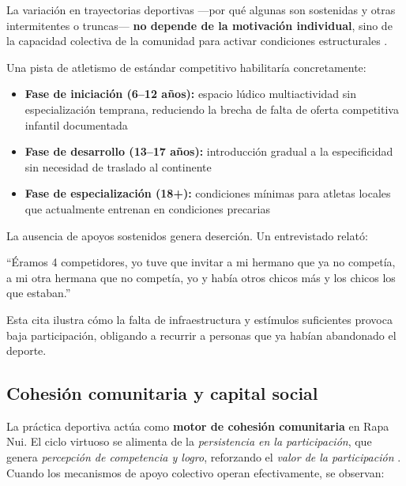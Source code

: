 \documentclass[12pt, a4paper]{article}
\begin{document}
La variación en trayectorias deportivas ---por qué algunas son sostenidas y otras
intermitentes o truncas--- \textbf{no depende de la motivación individual}, sino de
la capacidad colectiva de la comunidad para activar condiciones estructurales
\citep{ortega2026}.

Una pista de atletismo de estándar competitivo habilitaría concretamente:

\begin{itemize}[leftmargin=*, itemsep=4pt]
  \item \textbf{Fase de iniciación (6--12 años):} espacio lúdico multiactividad sin
        especialización temprana, reduciendo la brecha de falta de oferta competitiva
        infantil documentada
  \item \textbf{Fase de desarrollo (13--17 años):} introducción gradual a la
        especificidad sin necesidad de traslado al continente
  \item \textbf{Fase de especialización (18+):} condiciones mínimas para atletas
        locales que actualmente entrenan en condiciones precarias
\end{itemize}

La ausencia de apoyos sostenidos genera deserción. Un entrevistado relató:

\begin{citaetno}
``Éramos 4 competidores, yo tuve que invitar a mi hermano que ya no competía,
a mi otra hermana que no competía, yo y había otros chicos más y los chicos
los que estaban.''\\[4pt]
\end{citaetno}

Esta cita ilustra cómo la falta de infraestructura y estímulos suficientes provoca
baja participación, obligando a recurrir a personas que ya habían abandonado el
deporte.

\subsection{Cohesión comunitaria y capital social}

La práctica deportiva actúa como \textbf{motor de cohesión comunitaria} en Rapa Nui.
El ciclo virtuoso se alimenta de la \textit{persistencia en la participación}, que
genera \textit{percepción de competencia y logro}, reforzando el \textit{valor de
la participación} \citep{ortega2026}. Cuando los mecanismos de apoyo colectivo
operan efectivamente, se observan:
\end{document}
